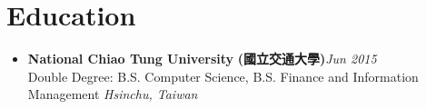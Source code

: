 \vspace{8pt}
\section{\sectionheading Education}

\begin{itemize}[leftmargin=0pt, label={}]%

\item{
{\sectionheading\large{\textbf{National Chiao Tung University}}} \textbf{(國立交通大學)}\hfill {\sectionheading\small{\textit{Jun 2015}}}\\
{\sectionheading\small{Double Degree: B.S. Computer Science, B.S. Finance and Information Management}}\hfill
{\sectionheading\small{\textit{Hsinchu, Taiwan}}}

}

\end{itemize}
